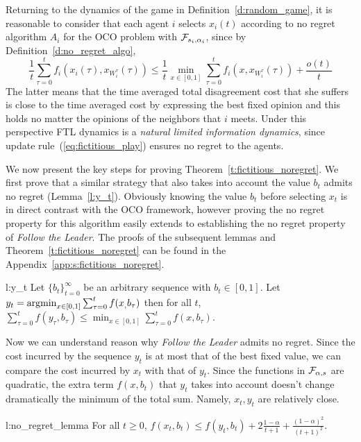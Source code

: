Returning to the dynamics of the game in Definition~\ref{d:random_game},
it is reasonable to consider that each agent $i$ selects $x_i(t)$ according
to no regret algorithm $A_i$ for the OCO problem with $\mathcal{F}_{s_i,\alpha_i}$,
since by Definition~\ref{d:no_regret_algo},
\[\frac{1}{t}\sum_{\tau=0}^t f_i(x_i(\tau),x_{W_i^\tau}(\tau)) \leq
\frac{1}{t}\min_{x \in [0,1]}\sum_{\tau=0}^tf_i(x,x_{W_i^\tau}(\tau)) + \frac{o(t)}{t}\]
The latter means that the time averaged total disagreement cost
that she suffers is close to the time averaged cost by expressing the
best fixed opinion and this holds no matter the opinions of the
neighbors that $i$ meets. Under this perspective FTL dynamics
is a \emph{natural limited information dynamics},
since update rule~(\ref{eq:fictitious_play}) ensures
no regret to the agents.


We now present the key steps for proving Theorem~\ref{t:fictitious_noregret}.
We first prove that a similar strategy that also takes into
account the value $b_t$ admits no regret (Lemma~\ref{l:y_t}).
Obviously knowing the value $b_t$ before selecting $x_t$
is in direct contrast with the OCO framework, however proving
the no regret property for this algorithm easily extends to
establishing the no regret property of \emph{Follow the Leader}.
The proofs of the subsequent lemmas and Theorem~\ref{t:fictitious_noregret} can
be found in the Appendix~\ref{app:s:fictitious_noregret}.
\begin{replemma}{l:y_t}
Let $\{b_t\}_{t=0}^\infty$ be an arbitrary sequence with $b_t \in [0,1]$.
Let $y_t = \operatorname*{argmin}_{x \in [0,1]}\sum_{\tau=0}^tf(x_,b_\tau)$
then for all $t$,
\(
\sum_{\tau=0}^t f(y_\tau,b_\tau) \leq \min_{x \in [0,1]}
\sum_{\tau = 0}^tf(x,b_\tau).
\)
\end{replemma}
Now we can understand reason why \emph{Follow the Leader}
admits no regret. Since the cost incurred by the sequence $y_t$ is at most that
of the best fixed value, we can compare the cost incurred by $x_t$ with
that of $y_t$.  Since the functions in $\mathcal{F}_{\alpha,s}$ are quadratic,
the extra term $f(x,b_t)$ that $y_t$ takes into account doesn't change
dramatically the minimum of the total sum. Namely, $x_t,y_t$
are relatively close.
\begin{replemma}{l:no_regret_lemma}
  For all $t\geq 0$,
  \(
    f(x_t,b_t) \leq f(y_t,b_t) + 2\frac{1-\alpha}{t+1} +
    \frac{(1-\alpha)^2}{(t+1)^2}
  \).
\end{replemma}
